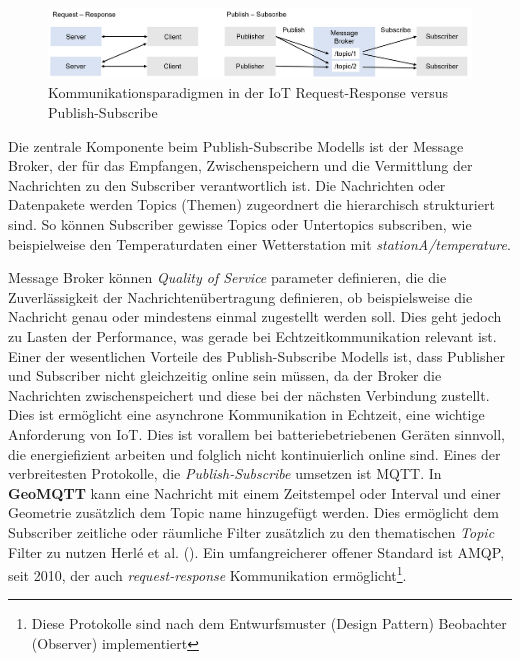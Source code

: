 \documentclass[
  11pt,
  a4paperpaper,
  oneside, openany  ,captions=tableheading
]{scrbook}
\theoremstyle{definition}
\theoremstyle{remark}
\begin{document}
\begin{figure}[H]

{\centering \includegraphics{images/publish-subcribe_request-response.png}

}

\caption{Kommunikationsparadigmen in der IoT Request-Response versus
Publish-Subscribe}

\end{figure}%

Die zentrale Komponente beim Publish-Subscribe Modells ist der Message
Broker, der für das Empfangen, Zwischenspeichern und die Vermittlung der
Nachrichten zu den Subscriber verantwortlich ist. Die Nachrichten oder
Datenpakete werden Topics (Themen) zugeordnert die hierarchisch
strukturiert sind. So können Subscriber gewisse Topics oder Untertopics
subscriben, wie beispielweise den Temperaturdaten einer Wetterstation
mit \emph{stationA/temperature}.

Message Broker können \emph{Quality of Service} parameter definieren,
die die Zuverlässigkeit der Nachrichtenübertragung definieren, ob
beispielsweise die Nachricht genau oder mindestens einmal zugestellt
werden soll. Dies geht jedoch zu Lasten der Performance, was gerade bei
Echtzeitkommunikation relevant ist. Einer der wesentlichen Vorteile des
Publish-Subscribe Modells ist, dass Publisher und Subscriber nicht
gleichzeitig online sein müssen, da der Broker die Nachrichten
zwischenspeichert und diese bei der nächsten Verbindung zustellt. Dies
ist ermöglicht eine asynchrone Kommunikation in Echtzeit, eine wichtige
Anforderung von IoT. Dies ist vorallem bei batteriebetriebenen Geräten
sinnvoll, die energiefizient arbeiten und folglich nicht kontinuierlich
online sind. Eines der verbreitesten Protokolle, die
\emph{Publish-Subscribe} umsetzen ist MQTT. In \textbf{GeoMQTT} kann
eine Nachricht mit einem Zeitstempel oder Interval und einer Geometrie
zusätzlich dem Topic name hinzugefügt werden. Dies ermöglicht dem
Subscriber zeitliche oder räumliche Filter zusätzlich zu den
thematischen \emph{Topic} Filter zu nutzen Herlé et al.
(). Ein umfangreicherer offener Standard
ist AMQP, seit 2010, der auch \emph{request-response} Kommunikation
ermöglicht\footnote{Diese Protokolle sind nach dem Entwurfsmuster
  (Design Pattern) Beobachter (Observer) implementiert}.
\end{document}
